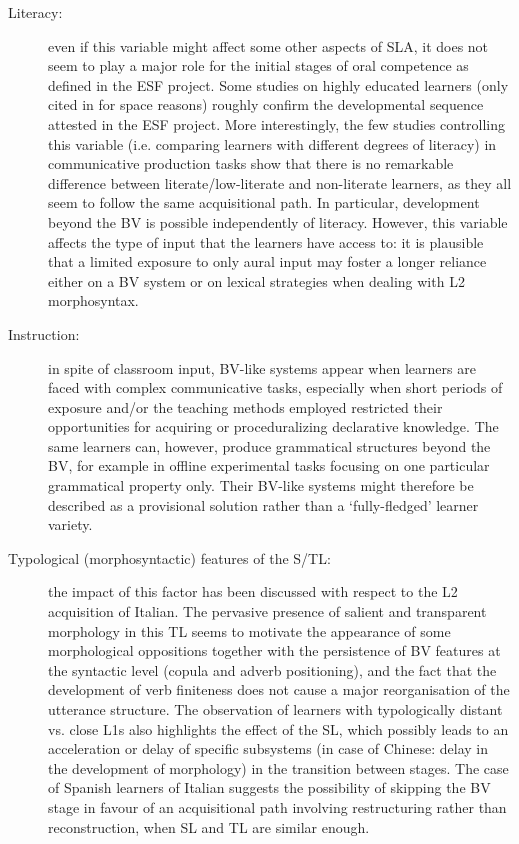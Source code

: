\documentclass[output=paper]{langscibook}
\begin{document}
\begin{description}
\item[Literacy:] even if this variable might affect some other aspects of SLA, it does not seem to play a major role for the initial stages of oral competence as defined in the ESF project. Some studies on highly educated learners (only cited in  for space reasons) roughly confirm the developmental sequence attested in the ESF project. More interestingly, the few studies controlling this variable (i.e. comparing learners with different degrees of literacy) in communicative production tasks show that there is no remarkable difference between literate\slash low-literate and non-literate learners, as they all seem to follow the same acquisitional path. In particular, development beyond the BV is possible independently of literacy. However, this variable affects the type of input that the learners have access to: it is plausible that a limited exposure to only aural input may foster a longer reliance either on a BV system or on lexical strategies when dealing with L2 morphosyntax.

\item[Instruction:] in spite of classroom input, BV-like systems appear when learners are faced with complex communicative tasks, especially when short periods of exposure and/or the teaching methods employed restricted their opportunities for acquiring or proceduralizing declarative knowledge. The same learners can, however, produce grammatical structures beyond the BV, for example in offline experimental tasks focusing on one particular grammatical property only. Their BV-like systems might therefore be described as a provisional solution rather than a ‘fully-fledged’ learner variety.

\item[Typological (morphosyntactic) features of the S/TL:] the impact of this factor has been discussed with respect to the L2 acquisition of Italian. The pervasive presence of salient and transparent morphology in this TL seems to motivate the appearance of some morphological oppositions together with the persistence of BV features at the syntactic level (copula and adverb positioning), and the fact that the development of verb finiteness does not cause a major reorganisation of the utterance structure. The observation of learners with typologically distant vs. close L1s also highlights the effect of the SL, which possibly leads to an acceleration or delay of specific subsystems (in case of Chinese: delay in the development of morphology) in the transition between stages. The case of Spanish learners of Italian suggests the possibility of skipping the BV stage in favour of an acquisitional path involving restructuring rather than reconstruction, when SL and TL are similar enough.
\end{description}
\end{document}
